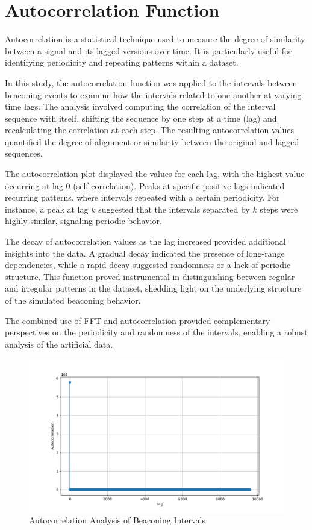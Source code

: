 \section{Autocorrelation Function}
Autocorrelation is a statistical technique used to measure the degree of similarity between a signal and its lagged versions over time. It is particularly useful for identifying periodicity and repeating patterns within a dataset.

In this study, the autocorrelation function was applied to the intervals between beaconing events to examine how the intervals related to one another at varying time lags. The analysis involved computing the correlation of the interval sequence with itself, shifting the sequence by one step at a time (lag) and recalculating the correlation at each step. The resulting autocorrelation values quantified the degree of alignment or similarity between the original and lagged sequences.

The autocorrelation plot displayed the values for each lag, with the highest value occurring at lag 0 (self-correlation). Peaks at specific positive lags indicated recurring patterns, where intervals repeated with a certain periodicity. For instance, a peak at lag \(k\) suggested that the intervals separated by \(k\) steps were highly similar, signaling periodic behavior.

The decay of autocorrelation values as the lag increased provided additional insights into the data. A gradual decay indicated the presence of long-range dependencies, while a rapid decay suggested randomness or a lack of periodic structure. This function proved instrumental in distinguishing between regular and irregular patterns in the dataset, shedding light on the underlying structure of the simulated beaconing behavior.

The combined use of FFT and autocorrelation provided complementary perspectives on the periodicity and randomness of the intervals, enabling a robust analysis of the artificial data.

\begin{figure}
    \centering
    \includegraphics[width=\textwidth]{../Thesis_Docs/media/autocorrelation.png}
    \caption{Autocorrelation Analysis of Beaconing Intervals}
    \label{fig:Autocorrelation}
\end{figure}

